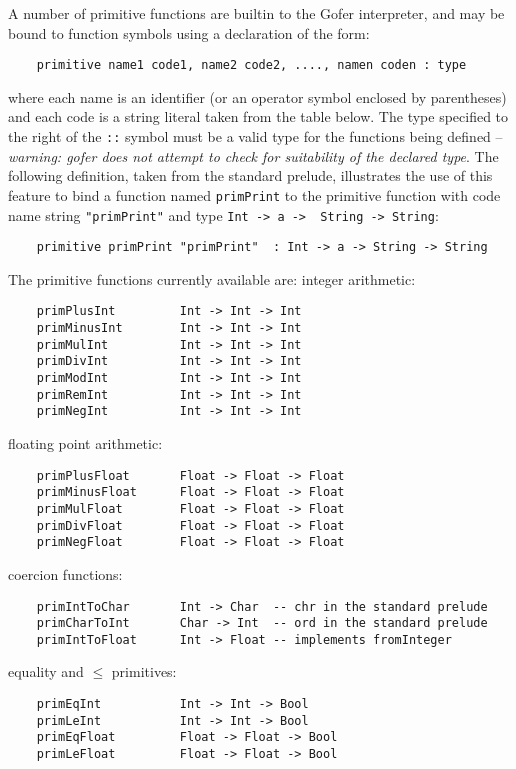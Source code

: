 A number of primitive functions are builtin to the  Gofer  interpreter,
and may be bound to function symbols using a declaration of the form:
\begin{verbatim}
    primitive name1 code1, name2 code2, ...., namen coden : type
\end{verbatim}
where each name is an identifier (or an  operator  symbol  enclosed  by
parentheses) and each code is a string literal  taken  from  the  table
below.  The type specified to the right of the  \verb"::"  symbol  must  be  a
valid type for the functions being defined -- {\em warning: gofer  does  not
attempt to check for suitability of the declared type}.   The  following
definition, taken from the standard prelude,  illustrates  the  use  of
this feature to bind  a  function  named  \verb"primPrint"  to  the  primitive
function with code name string \verb="primPrint"= and type 
\verb"Int -> a ->  String -> String":
\begin{verbatim}
    primitive primPrint "primPrint"  : Int -> a -> String -> String
\end{verbatim}
The primitive functions currently available are:
\BI
\IT integer arithmetic:
\begin{verbatim}
    primPlusInt         Int -> Int -> Int 
    primMinusInt        Int -> Int -> Int
    primMulInt          Int -> Int -> Int
    primDivInt          Int -> Int -> Int
    primModInt          Int -> Int -> Int
    primRemInt          Int -> Int -> Int
    primNegInt          Int -> Int -> Int
\end{verbatim}
\IT floating point arithmetic:
\begin{verbatim}
    primPlusFloat       Float -> Float -> Float
    primMinusFloat      Float -> Float -> Float
    primMulFloat        Float -> Float -> Float
    primDivFloat        Float -> Float -> Float
    primNegFloat        Float -> Float -> Float
\end{verbatim}
\newpage
\IT coercion functions:
\begin{verbatim}
    primIntToChar       Int -> Char  -- chr in the standard prelude
    primCharToInt       Char -> Int  -- ord in the standard prelude
    primIntToFloat      Int -> Float -- implements fromInteger
\end{verbatim}
\IT equality and $\le$ primitives:
\begin{verbatim}
    primEqInt           Int -> Int -> Bool
    primLeInt           Int -> Int -> Bool
    primEqFloat         Float -> Float -> Bool
    primLeFloat         Float -> Float -> Bool
\end{verbatim}

